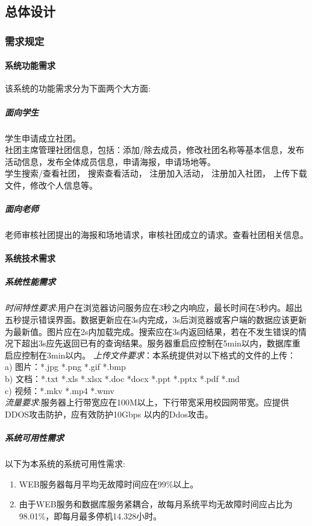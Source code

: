 \documentclass[UTF8]{ctexart}
\begin{document}
\subsection{总体设计}
\subsubsection{需求规定}
\paragraph{系统功能需求}
该系统的功能需求分为下面两个大方面:
\subparagraph*{面向学生}
学生申请成立社团。\\
社团主席管理社团信息，包括：添加/除去成员，修改社团名称等基本信息，发布活动信息，发布全体成员信息，申请海报，申请场地等。\\
学生搜索/查看社团， 搜索查看活动， 注册加入活动， 注册加入社团， 上传下载文件，修改个人信息等。\\
\subparagraph*{面向老师}
老师审核社团提出的海报和场地请求，审核社团成立的请求。查看社团相关信息。

\paragraph{系统技术需求}
\subparagraph*{系统性能需求}
\emph{时间特性要求}:用户在浏览器访问服务应在3秒之内响应，最长时间在5秒内。超出五秒提示错误界面。数据更新应在3s内完成，3s后浏览器或客户端的数据应该更新为最新值。图片应在2s内加载完成。搜索应在3s内返回结果，若在不发生错误的情况下超出3s应先返回已有的查询结果。服务器重启应控制在5min以内，数据库重启应控制在3min以内。
\emph{上传文件要求}：本系统提供对以下格式的文件的上传：\\
a)	图片：*.jpg  *.png  *.gif   *.bmp\\
b)	文档：*.txt   *.xls    *.xlsx  *.doc  *docx  *.ppt *.pptx  *.pdf  *.md\\
c)	视频：*.mkv  *.mp4  *.wmv  \\
\emph{流量要求}:服务器上行带宽应在100M以上，下行带宽采用校园网带宽。应提供DDOS攻击防护，应有效防护10Gbps 以内的Ddos攻击。
\subparagraph*{系统可用性需求}
以下为本系统的系统可用性需求:\\
\begin{enumerate}[1)]
\item WEB服务器每月平均无故障时间应在99\%以上。
\item 由于WEB服务和数据库服务紧耦合，故每月系统平均无故障时间应占比为98.01\%，即每月最多停机14.328小时。
\end{enumerate}
\end{document}
